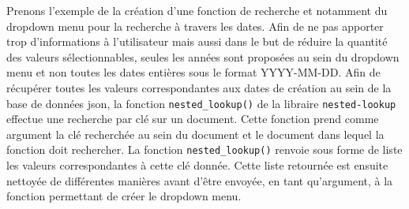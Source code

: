 \documentclass[a4paper, 12pt, twoside]{book}
\begin{document}
Prenons l'exemple de la création d'une fonction de recherche et notamment du dropdown menu pour la recherche à travers les dates. Afin de ne pas apporter trop d'informations à l'utilisateur mais aussi dans le but de réduire la quantité des valeurs sélectionnables, seules les années sont proposées au sein du dropdown menu et non toutes les dates entières sous le format YYYY-MM-DD. Afin de récupérer toutes les valeurs correspondantes aux dates de création au sein de la base de données \gls{json}, la fonction \texttt{nested\_lookup()} de la libraire \texttt{nested-lookup} effectue une recherche par clé sur un document. Cette fonction prend comme argument la clé recherchée au sein du document et le document dans lequel la fonction doit rechercher.  La fonction \texttt{nested\_lookup()} renvoie sous forme de liste les valeurs correspondantes à cette clé donnée. Cette liste retournée est ensuite nettoyée de différentes manières avant d'être envoyée, en tant qu'argument, à la fonction permettant de créer le dropdown menu.
\end{document}
